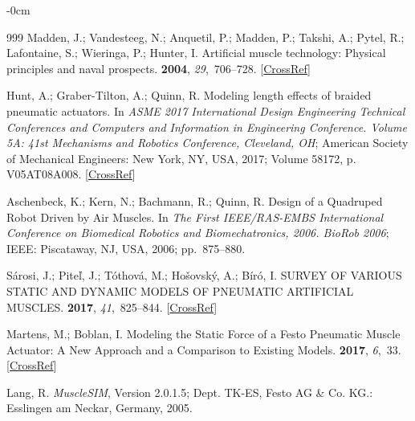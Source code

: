 \documentclass[actuators,article,accept,pdftex,moreauthors]{Definitions/mdpi}
\begin{document}
\begin{adjustwidth}{-\extralength}{0cm}
\begin{thebibliography}{999}
Madden, J.; Vandesteeg, N.; Anquetil, P.; Madden, P.; Takshi, A.; Pytel, R.;
Lafontaine, S.; Wieringa, P.; Hunter, I.
\newblock Artificial muscle technology: Physical principles and naval
prospects.
 {\bf 2004}, {\em
29},~706--728. [\href{http://dx.doi.org/10.1109/JOE.2004.833135}{CrossRef}]

Hunt, A.; Graber-Tilton, A.; Quinn, R.
\newblock Modeling length effects of braided pneumatic actuators.
\newblock In \emph{{ASME 2017 International Design Engineering Technical Conferences and Computers and Information in Engineering Conference.} 
Volume {5A}: 41st {Mechanisms} and {Robotics}
{Conference}, {Cleveland, OH}};  {American Society of Mechanical Engineers: New York, NY, USA,} 
2017; Volume 58172, p. V05AT08A008. [\href{http://dx.doi.org/10.1115/detc2017-67458}{CrossRef}]

Aschenbeck, K.; Kern, N.; Bachmann, R.; Quinn, R.
\newblock Design of a {Quadruped} {Robot} {Driven} by {Air} {Muscles}.
\newblock In \emph{The {First} {IEEE}/{RAS}-{EMBS} {International}
{Conference} on {Biomedical} {Robotics} and {Biomechatronics}, 2006. {BioRob}
2006};  {IEEE: Piscataway, NJ, USA,} 2006; \mbox{pp. 875--880.}

Sárosi, J.; Piteľ, J.; Tóthová, M.; Hošovský, A.; Bíró, I.
 {SURVEY} {OF} {VARIOUS} {STATIC} {AND} {DYNAMIC}
{MODELS} {OF} {PNEUMATIC} {ARTIFICIAL} {MUSCLES}.
{\bf 2017}, {\em 41},~825--844. [\href{http://dx.doi.org/10.1139/tcsme-2017-514}{CrossRef}]

Martens, M.; Boblan, I.
\newblock Modeling the {Static} {Force} of a {Festo} {Pneumatic} {Muscle}
{Actuator}: {A} {New} {Approach} and a {Comparison} to {Existing} {Models}.
 {\bf 2017}, {\em 6},~33. [\href{http://dx.doi.org/10.3390/act6040033}{CrossRef}]

Lang, R.
\newblock \emph{{MuscleSIM}}, Version 2.0.1.5; {Dept. TK-ES, Festo AG \& Co. KG.:} 
{Esslingen am Neckar, Germany,}  2005.


\end{thebibliography}
\end{adjustwidth}
\end{document}
